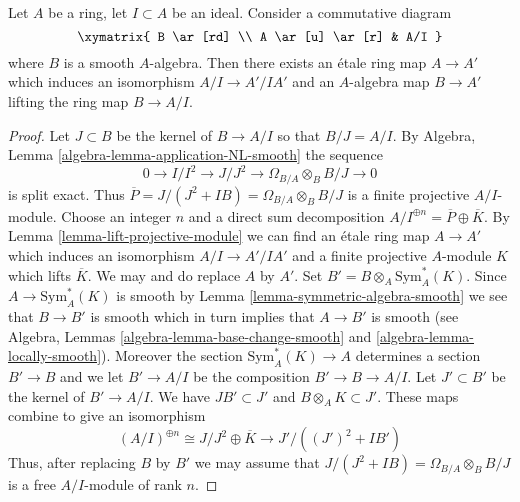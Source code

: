 \begin{lemma}
\label{lemma-lift-section-smooth-morphism}
Let $A$ be a ring, let $I \subset A$ be an ideal. Consider a commutative
diagram
$$
\xymatrix{
B \ar[rd] \\
A \ar[u] \ar[r] & A/I
}
$$
where $B$ is a smooth $A$-algebra. Then there exists an \'etale ring
map $A \to A'$ which induces an isomorphism $A/I \to A'/IA'$ and an
$A$-algebra map $B \to A'$ lifting the ring map $B \to A/I$.
\end{lemma}

\begin{proof}
Let $J \subset B$ be the kernel of $B \to A/I$ so that $B/J = A/I$. By
Algebra, Lemma \ref{algebra-lemma-application-NL-smooth} the sequence
$$
0 \to I/I^2 \to J/J^2 \to \Omega_{B/A} \otimes_B B/J \to 0
$$
is split exact. Thus $\overline{P} = J/(J^2 + IB) = \Omega_{B/A} \otimes_B B/J$
is a finite projective $A/I$-module. Choose an integer $n$ and a direct sum
decomposition $A/I^{\oplus n} = \overline{P} \oplus \overline{K}$.
By Lemma \ref{lemma-lift-projective-module} we can find an
\'etale ring map $A \to A'$ which induces an isomorphism
$A/I \to A'/IA'$ and a finite projective $A$-module $K$ which
lifts $\overline{K}$. We may and do replace $A$ by $A'$.
Set $B' = B \otimes_A \text{Sym}_A^*(K)$. Since $A \to \text{Sym}_A^*(K)$
is smooth by Lemma \ref{lemma-symmetric-algebra-smooth} we see that
$B \to B'$ is smooth which in turn implies that $A \to B'$ is smooth (see
Algebra, Lemmas \ref{algebra-lemma-base-change-smooth} and
\ref{algebra-lemma-locally-smooth}).
Moreover the section $\text{Sym}^*_A(K) \to A$ determines a section
$B' \to B$ and we let $B' \to A/I$ be the composition $B' \to B \to A/I$.
Let $J' \subset B'$ be the kernel of $B' \to A/I$. We have
$JB' \subset J'$ and $B \otimes_A K \subset J'$. These maps combine
to give an isomorphism
$$
(A/I)^{\oplus n} \cong J/J^2 \oplus \overline{K}
\longrightarrow
J'/((J')^2 + IB')
$$
Thus, after replacing $B$ by $B'$ we may assume that
$J/(J^2 + IB) = \Omega_{B/A} \otimes_B B/J$ is a free
$A/I$-module of rank $n$.


\end{proof}

